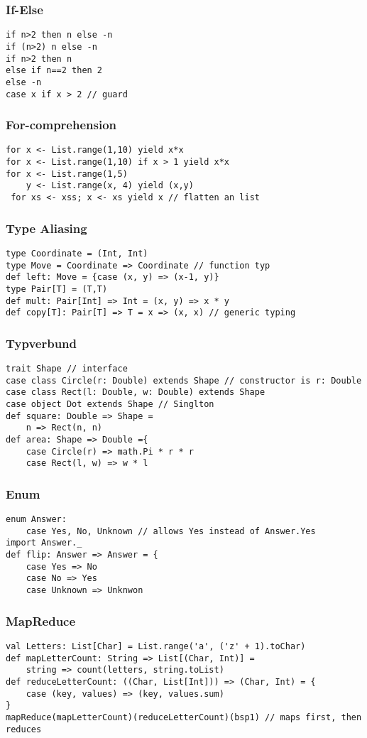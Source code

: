 \subsubsection{If-Else}
\begin{verbatim}
if n>2 then n else -n
if (n>2) n else -n
if n>2 then n
else if n==2 then 2
else -n
case x if x > 2 // guard
\end{verbatim}
\subsubsection{For-comprehension}
\begin{verbatim}
for x <- List.range(1,10) yield x*x
for x <- List.range(1,10) if x > 1 yield x*x
for x <- List.range(1,5)
    y <- List.range(x, 4) yield (x,y)
 for xs <- xss; x <- xs yield x // flatten an list
\end{verbatim}
\subsubsection{Type Aliasing}
\begin{verbatim}
type Coordinate = (Int, Int)
type Move = Coordinate => Coordinate // function typ
def left: Move = {case (x, y) => (x-1, y)}
type Pair[T] = (T,T)
def mult: Pair[Int] => Int = (x, y) => x * y
def copy[T]: Pair[T] => T = x => (x, x) // generic typing
\end{verbatim}
\subsubsection{Typverbund}
\begin{verbatim}
trait Shape // interface
case class Circle(r: Double) extends Shape // constructor is r: Double
case class Rect(l: Double, w: Double) extends Shape
case object Dot extends Shape // Singlton
def square: Double => Shape =
    n => Rect(n, n)
def area: Shape => Double ={
    case Circle(r) => math.Pi * r * r
    case Rect(l, w) => w * l
\end{verbatim}
\subsubsection{Enum}
\begin{verbatim}
enum Answer:
	case Yes, No, Unknown // allows Yes instead of Answer.Yes
import Answer._ 
def flip: Answer => Answer = {
    case Yes => No
    case No => Yes
    case Unknown => Unknwon
\end{verbatim}
\subsubsection{MapReduce}
\begin{verbatim}
val Letters: List[Char] = List.range('a', ('z' + 1).toChar)
def mapLetterCount: String => List[(Char, Int)] = 
    string => count(letters, string.toList)
def reduceLetterCount: ((Char, List[Int])) => (Char, Int) = {
    case (key, values) => (key, values.sum)
}
mapReduce(mapLetterCount)(reduceLetterCount)(bsp1) // maps first, then reduces	
\end{verbatim}
